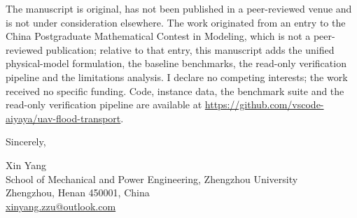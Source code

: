 \documentclass[11pt]{article}
\begin{document}
The manuscript is original, has not been published in a peer-reviewed venue
and is not under consideration elsewhere. The work originated from an entry to
the China Postgraduate Mathematical Contest in Modeling, which is not a
peer-reviewed publication; relative to that entry, this manuscript adds the
unified physical-model formulation, the baseline benchmarks, the read-only
verification pipeline and the limitations analysis. I declare no competing
interests; the work received no specific funding. Code, instance data, the benchmark suite and the read-only
verification pipeline are available at
\url{https://github.com/vscode-aiyaya/uav-flood-transport}.

\vspace{10pt}
Sincerely,

\vspace{16pt}
Xin Yang\\
School of Mechanical and Power Engineering, Zhengzhou University\\
Zhengzhou, Henan 450001, China\\
\href{mailto:xinyang.zzu@outlook.com}{xinyang.zzu@outlook.com}
\end{document}
